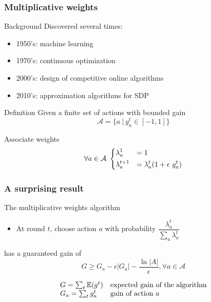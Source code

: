 \documentclass{beamer}
\begin{document}
\begin{frame}
    \frametitle{Multiplicative weights}

    \begin{block}{Background}
        Discovered several times:
        \begin{itemize}
            \item 1950's: machine learning
            \item 1970's: continuous optimization
            \item 2000's: design of competitive online algorithms
            \item 2010's: approximation algorithms for SDP
        \end{itemize}
    \end{block}
    \begin{block}{Definition}
        Given a finite set of actions with bounded gain
        \begin{equation*}
            \mathcal{A} = \{ a~|~g_a^t \in [-1, 1]  \}
        \end{equation*}

        Associate weights 
        \begin{equation*}
        \forall a\in\mathcal{A}~
        \begin{dcases}
            \lambda_a^{1} &= 1\\
            \lambda_a^{t+1} &= \lambda_a^t (1 + \epsilon~g_a^t)
        \end{dcases}
        \end{equation*}
    \end{block}

\end{frame}

\begin{frame}
    \frametitle{A surprising result}

    \begin{block}{The multiplicative weights algorithm}
        \begin{itemize}
            \item At round $t$, choose action $a$ with probability
                $\dfrac{\lambda_a^t}{\sum_a \lambda_a^t}$
        \end{itemize}
    \end{block}

    \begin{block}{has a guaranteed gain of}
        \begin{equation*}
        G \geq G_a - \epsilon |G_a| - \frac{\ln |A|}{\epsilon}, \forall a \in
        \mathcal{A}
        \end{equation*}
    \end{block}
    
    \begin{equation*}
    \begin{array}{l l}
        G = \sum_t \mathbb{E}(g^t) & \text{expected gain of the algorithm}\\
        G_a = \sum_t g^t_a & \text{gain of action $a$}
    \end{array}
    \end{equation*}

\end{frame}
\end{document}
